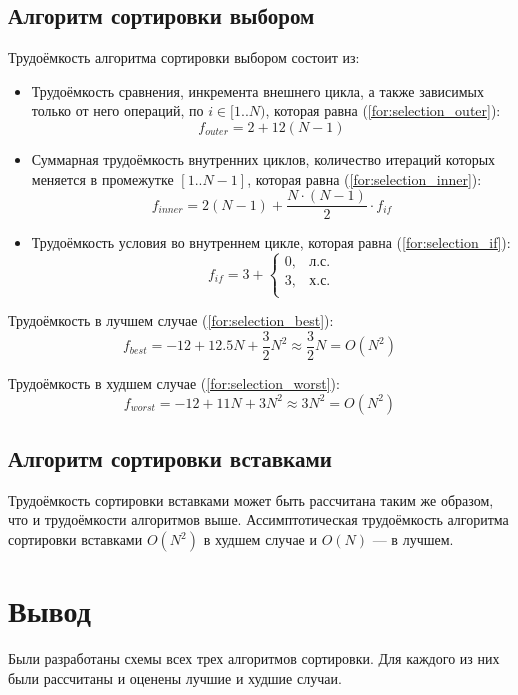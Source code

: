 \subsection{Алгоритм сортировки выбором}

Трудоёмкость алгоритма сортировки выбором состоит из:
\begin{itemize}
    \item Трудоёмкость сравнения, инкремента внешнего цикла, а также зависимых только от него операций, по $i \in [1..N)$, которая равна (\ref{for:selection_outer}):
        \begin{equation}
            \label{for:selection_outer}
            f_{outer} = 2 + 12(N - 1)
        \end{equation}
    \item Суммарная трудоёмкость внутренних циклов, количество итераций которых меняется в промежутке $[1..N-1]$, которая равна (\ref{for:selection_inner}):
        \begin{equation}
            \label{for:selection_inner}
            f_{inner} = 2(N - 1) + \frac{N \cdot (N - 1)}{2} \cdot f_{if}
        \end{equation}
    \item Трудоёмкость условия во внутреннем цикле, которая равна (\ref{for:selection_if}):
        \begin{equation}
            \label{for:selection_if}
            f_{if} = 3 + \begin{cases}
                0, & \text{л.с.}\\
                3, & \text{х.с.}\\
            \end{cases}
        \end{equation}
\end{itemize}

Трудоёмкость в лучшем случае (\ref{for:selection_best}):
\begin{equation}
    \label{for:selection_best}
    f_{best} = -12 + 12.5N + \frac{3}{2}N^2 \approx \frac{3}{2}N = O(N^2)
\end{equation}

Трудоёмкость в худшем случае (\ref{for:selection_worst}):
\begin{equation}
    \label{for:selection_worst}
    f_{worst} = -12 + 11N + 3N^2 \approx 3N^2 = O(N^2)
\end{equation}


\subsection{Алгоритм сортировки вставками}

Трудоёмкость сортировки вставками может быть рассчитана таким же образом, что и трудоёмкости алгоритмов выше. Ассимптотическая трудоёмкость алгоритма сортировки вставками $O(N^2)$ в худшем случае и $O(N)$ --- в лучшем.

\section*{Вывод}

Были разработаны схемы всех трех алгоритмов сортировки.
Для каждого из них были рассчитаны и оценены лучшие и худшие случаи.
